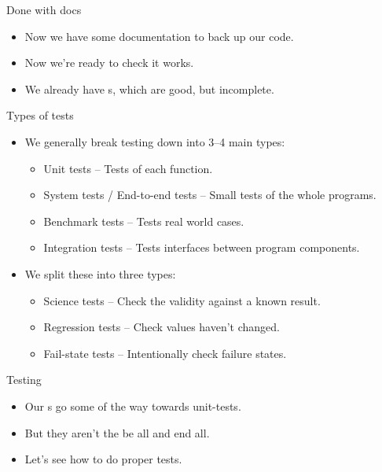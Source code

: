 \documentclass[usenames,dvipsnames]{beamer}
\newcommand{\kw}[1]{\textcolor{red}{\texttt{\detokenize{#1}}}}
\begin{document}
\begin{frame}{Done with docs}
    \begin{itemize}[<+->]
        \item{}Now we have some documentation to back up our code.
        \item{}Now we're ready to check it works.
        \item{}We already have \kw{doctest}s, which are good, but incomplete.
    \end{itemize}
\end{frame}

\begin{frame}{Types of tests}
    \begin{itemize}[<+->]
        \item{}We generally break testing down into 3--4 main types:
        \begin{itemize}
            \item{}Unit tests -- Tests of each function.
            \item{}System tests / End-to-end tests -- Small tests of the whole programs.
            \item{}Benchmark tests -- Tests real world cases.
            \item{}Integration tests -- Tests interfaces between program components.
        \end{itemize}
        \item{}We split these into three types:
        \begin{itemize}
            \item{}Science tests -- Check the validity against a known result.
            \item{}Regression tests -- Check values haven't changed.
            \item{}Fail-state tests -- Intentionally check failure states.
        \end{itemize}
    \end{itemize}
\end{frame}

\begin{frame}{Testing}
    \begin{itemize}[<+->]
        \item{}Our \kw{doctest}s go some of the way towards unit-tests.
        \item{}But they aren't the be all and end all.
        \item{}Let's see how to do proper tests.
    \end{itemize}
\end{frame}
\end{document}
